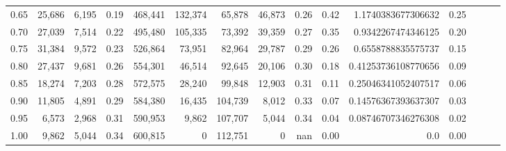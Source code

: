 \begin{tabular}{rrrrrrrrrrrrrrr}
0.65 &  25,686 &  6,195 &  0.19 &  468,441 &  132,374 &   65,878 &   46,873 &  0.26 &  0.42 &   1.1740383677306632 &      0.25 \\
0.70 &  27,039 &  7,514 &  0.22 &  495,480 &  105,335 &   73,392 &   39,359 &  0.27 &  0.35 &   0.9342267474346125 &      0.20 \\
0.75 &  31,384 &  9,572 &  0.23 &  526,864 &   73,951 &   82,964 &   29,787 &  0.29 &  0.26 &   0.6558788835575737 &      0.15 \\
0.80 &  27,437 &  9,681 &  0.26 &  554,301 &   46,514 &   92,645 &   20,106 &  0.30 &  0.18 &  0.41253736108770656 &      0.09 \\
0.85 &  18,274 &  7,203 &  0.28 &  572,575 &   28,240 &   99,848 &   12,903 &  0.31 &  0.11 &  0.25046341052407517 &      0.06 \\
0.90 &  11,805 &  4,891 &  0.29 &  584,380 &   16,435 &  104,739 &    8,012 &  0.33 &  0.07 &  0.14576367393637307 &      0.03 \\
0.95 &   6,573 &  2,968 &  0.31 &  590,953 &    9,862 &  107,707 &    5,044 &  0.34 &  0.04 &  0.08746707346276308 &      0.02 \\
1.00 &   9,862 &  5,044 &  0.34 &  600,815 &        0 &  112,751 &        0 &   nan &  0.00 &                  0.0 &      0.00 \\
\bottomrule
\end{tabular}
